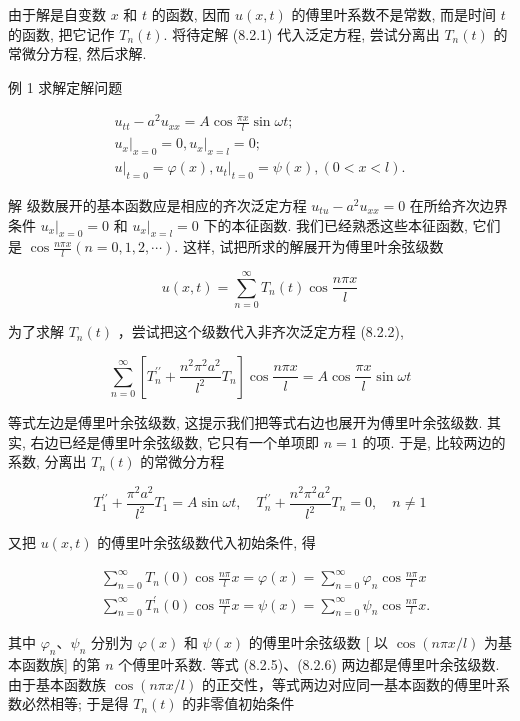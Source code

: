 由于解是自变数 $x$ 和 $t$ 的函数, 因而 $u(x, t)$ 的傅里叶系数不是常数, 而是时间 $t$ 的函数, 把它记作 $T_{n}(t)$. 将待定解 (8.2.1) 代入泛定方程, 尝试分离出 $T_{n}(t)$ 的常微分方程, 然后求解.

例 1 求解定解问题

$$
\begin{gathered}
u_{t t}-a^{2} u_{x x}=A \cos \frac{\pi x}{l} \sin \omega t ; \\
\left.u_{x}\right|_{x=0}=0,\left.u_{x}\right|_{x=l}=0 ; \\
\left.u\right|_{t=0}=\varphi(x),\left.u_{t}\right|_{t=0}=\psi(x),(0<x<l) .
\end{gathered}
$$

解 级数展开的基本函数应是相应的齐次泛定方程 $u_{t u}-a^{2} u_{x x}=0$ 在所给齐次边界条件 $\left.u_{x}\right|_{x=0}=0$ 和 $\left.u_{x}\right|_{x=l}=0$ 下的本征函数. 我们已经熟悉这些本征函数, 它们是 $\cos \frac{n \pi x}{l}(n=0,1,2, \cdots)$. 这样, 试把所求的解展开为傅里叶余弦级数

$$
u(x, t)=\sum_{n=0}^{\infty} T_{n}(t) \cos \frac{n \pi x}{l}
$$

为了求解 $T_{n}(t)$ ，尝试把这个级数代入非齐次泛定方程 (8.2.2),

$$
\sum_{n=0}^{\infty}\left[T_{n}^{\prime \prime}+\frac{n^{2} \pi^{2} a^{2}}{l^{2}} T_{n}\right] \cos \frac{n \pi x}{l}=A \cos \frac{\pi x}{l} \sin \omega t
$$

等式左边是傅里叶余弦级数, 这提示我们把等式右边也展开为傅里叶余弦级数. 其实, 右边已经是傅里叶余弦级数, 它只有一个单项即 $n=1$ 的项. 于是, 比较两边的系数, 分离出 $T_{n}(t)$ 的常微分方程

$$
T_{1}^{\prime \prime}+\frac{\pi^{2} a^{2}}{l^{2}} T_{1}=A \sin \omega t, \quad T_{n}^{\prime \prime}+\frac{n^{2} \pi^{2} a^{2}}{l^{2}} T_{n}=0, \quad n \neq 1
$$

又把 $u(x, t)$ 的傅里叶余弦级数代入初始条件, 得

$$
\begin{aligned}
& \sum_{n=0}^{\infty} T_{n}(0) \cos \frac{n \pi}{l} x=\varphi(x)=\sum_{n=0}^{\infty} \varphi_{n} \cos \frac{n \pi}{l} x \\
& \sum_{n=0}^{\infty} T_{n}^{\prime}(0) \cos \frac{n \pi}{l} x=\psi(x)=\sum_{n=0}^{\infty} \psi_{n} \cos \frac{n \pi}{l} x .
\end{aligned}
$$

其中 $\varphi_{n} 、 \psi_{n}$ 分别为 $\varphi(x)$ 和 $\psi(x)$ 的傅里叶余弦级数 [ 以 $\cos (n \pi x / l)$ 为基本函数族] 的第 $n$ 个傅里叶系数. 等式 (8.2.5)、(8.2.6) 两边都是傅里叶余弦级数. 由于基本函数族 $\cos (n \pi x / l)$ 的正交性，等式两边对应同一基本函数的傅里叶系数必然相等; 于是得 $T_{n}(t)$ 的非零值初始条件

